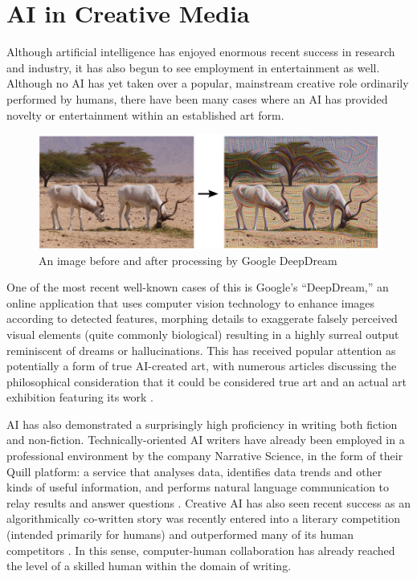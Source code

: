 \documentclass[ author={Stephen Livermore-Tozer},
				supervisor={Dr. Peter Flach},
				degree={MEng},
				title={Algorithmic Co-composition Using Machine Learning},
				subtitle={},
				type={research},
				year={2016} ]{dissertation}
\begin{document}
	\section{AI in Creative Media}
	
	Although artificial intelligence has enjoyed enormous recent success in research and industry, it has also begun to see employment in entertainment as well. Although no AI has yet taken over a popular, mainstream creative role ordinarily performed by humans, there have been many cases where an AI has provided novelty or entertainment within an established art form.
	
	\begin{figure}[h]
		\centering
		\includegraphics[width=1.0\textwidth]{deep-dream-example}
		\caption{An image before and after processing by Google DeepDream}
	\end{figure}
	
	One of the most recent well-known cases of this is Google's ``DeepDream,'' an online application that uses computer vision technology to enhance images according to detected features, morphing details to exaggerate falsely perceived visual elements (quite commonly biological) resulting in a highly surreal output reminiscent of dreams or hallucinations. This has received popular attention as potentially a form of true AI-created art, with numerous articles discussing the philosophical consideration that it could be considered true art \cite{rayner2016google,galperina2015google} and an actual art exhibition featuring its work \cite{campbell2016inside}.
	
	AI has also demonstrated a surprisingly high proficiency in writing both fiction and non-fiction. Technically-oriented AI writers have already been employed in a professional environment by the company Narrative Science, in the form of their Quill platform: a service that analyses data, identifies data trends and other kinds of useful information, and performs natural language communication to relay results and answer questions \cite{woodie2016big}. Creative AI has also seen recent success as an algorithmically co-written story was recently entered into a literary competition (intended primarily for humans) and outperformed many of its human competitors \cite{tarantola2016ai}. In this sense, computer-human collaboration has already reached the level of a skilled human within the domain of writing. 
	
\end{document}
